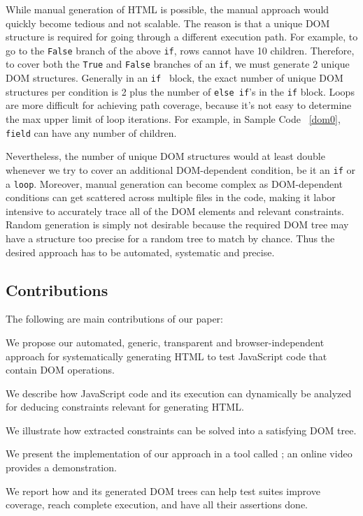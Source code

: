 While manual generation of HTML is possible, the manual approach would quickly become tedious and not scalable.  
The reason is that a unique DOM structure is required for going through a different execution path.
For example, to go to the {\tt False} branch of the above {\tt if}, rows cannot have 10 children.
Therefore, to cover both the {\tt True} and {\tt False} branches of an {\tt if}, we must generate 2 unique DOM structures.  Generally in an {\tt if } block, the exact number of unique DOM structures per condition is 2 plus the number of {\tt else if}'s in the {\tt if} block.  Loops are more difficult for achieving path coverage, because it's not easy to determine the max upper limit of loop iterations.  For example, in Sample Code ~\ref{dom0}, {\tt field} can have any number of children.

Nevertheless, the number of unique DOM structures would at least double whenever we try to cover an additional DOM-dependent condition, be it an {\tt if} or a {\tt loop}.  
Moreover, manual generation can become complex as DOM-dependent conditions can get scattered across multiple files in the code, making it labor intensive to accurately trace all of the DOM elements and relevant constraints.  
Random generation is simply not desirable because the required DOM tree may have a structure too precise for a random tree to match by chance.  
Thus the desired approach has to be automated, systematic and precise.


\subsection{Contributions}
The following are main contributions of our paper:
\begin {compactitem}
\item We propose our automated, generic, transparent and browser-independent approach for systematically generating HTML to test JavaScript code that contain DOM operations.
\item We describe how JavaScript code and its execution can dynamically be analyzed for deducing constraints relevant for generating HTML.
\item We illustrate how extracted constraints can be solved into a satisfying DOM tree.
\item We present the implementation of our approach in a tool called \tool; an online video provides a demonstration.
\item We report how \tool and its generated DOM trees can help test suites improve coverage, reach complete execution, and have all their assertions done.
\end {compactitem}

